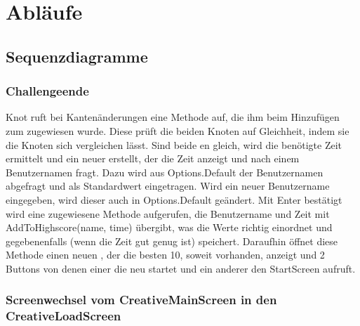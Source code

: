 \chapter{Abläufe}

\section{Sequenzdiagramme}

\subsection{Challengeende}

Knot ruft bei Kantenänderungen eine Methode auf, die ihm beim Hinzufügen zum  zugewiesen wurde. Diese prüft die beiden Knoten auf Gleichheit, indem sie die Knoten sich vergleichen lässt. Sind beide en gleich, wird die benötigte Zeit ermittelt und ein neuer  erstellt, der die Zeit anzeigt und nach einem Benutzernamen fragt.
\newline
Dazu wird aus Options.Default der Benutzernamen abgefragt und als Standardwert eingetragen. Wird ein neuer Benutzername eingegeben, wird dieser auch in Options.Default geändert. Mit Enter bestätigt wird eine zugewiesene Methode aufgerufen, die Benutzername und Zeit  mit AddToHighscore(name, time) übergibt, was die Werte richtig einordnet und gegebenenfalls (wenn die Zeit gut genug ist) speichert.
\newline
Daraufhin öffnet diese Methode einen neuen , der die besten 10, soweit vorhanden, anzeigt und 2 Buttons 
von denen einer die  neu startet und ein anderer den StartScreen aufruft.

\subsection{Screenwechsel vom CreativeMainScreen in den CreativeLoadScreen}

